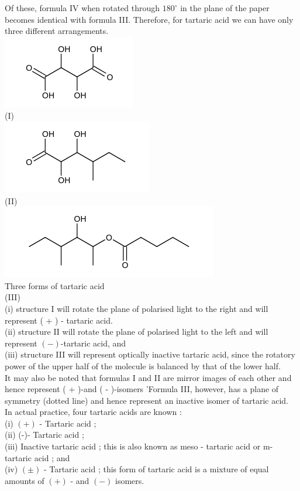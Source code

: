 \documentclass[10pt]{article}
\begin{document}
Of these, formula IV when rotated through $180^{\circ}$ in the plane of the paper becomes identical with formula III. Therefore, for tartaric acid we can have only three different arrangements.\\
\includegraphics{smile-cb3b52e806d96417804f3b1ebe215a9b264d8725}\\
(I)\\
\includegraphics{smile-57d7b5ee66883eba56be2f7d4b0720bae38c643e}\\
(II)\\
\includegraphics{smile-2ef52ce616e7b67bcff3db80432997a7abf99dc3}\\
Three forms of tartaric acid\\
(III)\\
(i) structure I will rotate the plane of polarised light to the right and will represent ( + ) - tartaric acid.\\
(ii) structure II will rotate the plane of polarised light to the left and will represent $(-)$-tartaric acid, and\\
(iii) structure III will represent optically inactive tartaric acid, since the rotatory power of the upper half of the molecule is balanced by that of the lower half.\\
It may also be noted that formulas I and II are mirror images of each other and hence represent ( + )-and ( - )-isomers 'Formula III, however, has a plane of symmetry (dotted line) and hence represent an inactive isomer of tartaric acid.\\
In actual practice, four tartaric acids are known :\\
(i) $(+)$ - Tartaric acid ;\\
(ii) (-)- Tartaric acid ;\\
(iii) Inactive tartaric acid ; this is also known as meso - tartaric acid or m-tartaric acid ; and\\
(iv) $( \pm)$ - Tartaric acid ; this form of tartaric acid is a mixture of equal amounts of $(+)$ - and $(-)$ isomers.
\end{document}
